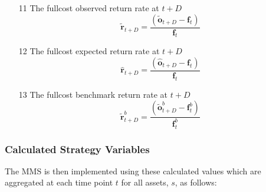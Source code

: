 \documentclass[a4paper,11pt,oneside]{article}
\theoremstyle{plain}
\theoremstyle{definition}
\begin{document}
\begin{itemize}
		
		\item [11] The fullcost observed return rate at $t+D$
		\begin{equation}
		\mathbf{\tilde{r}}_{t + D} = \frac{\left( \mathbf{\tilde{o}}_{t+D} - \mathbf{f}_t \right) }
		{\mathbf{f}_t}
		\end{equation}	
		\item [12] The fullcost expected return rate at $t+D$
		\begin{equation}
		\mathbf{\hat{r}}_{t + D} = \frac{\left( \mathbf{\hat{o}}_{t+D} - \mathbf{f}_t \right) }
		{\mathbf{f}_t}
		\end{equation}
		\item [13] The fullcost benchmark return rate at $t+D$
		\begin{equation}
		\mathbf{\tilde{r}}^b_{t + D} = \frac{\left( \mathbf{\tilde{o}}^b_{t+D} - \mathbf{f}^b_t \right) }
		{\mathbf{f}^b_t}
		\end{equation}	
		
		
	\end{itemize}
	\hfill\break
	
	
	\subsubsection{Calculated Strategy Variables} The MMS  is then implemented using these calculated values which are aggregated at each time point $t$ for all assets, $s$, as follows:
	
	
	
		
\end{document}
